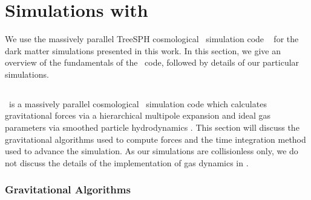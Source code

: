 
%
%

\section{Simulations with \gadgettwo}
\label{sec:gadget}



We use the massively parallel TreeSPH \citep{1989ApJS...70..419H} cosmological \nbody\ simulation code \gadgettwo\ \citep{2001NewA....6...79S, 2005MNRAS.364.1105S} for the dark matter simulations presented in this work.  In this section, we give an overview of the fundamentals of the \gadgettwo\ code, followed by details of our particular simulations.




\subsection{\gadgettwo}
\label{subsec:gadget--gadget}


\gadgettwo\ is a massively parallel cosmological \nbody\ simulation code which calculates gravitational forces via a hierarchical multipole expansion and ideal gas parameters via smoothed particle hydrodynamics \citep[SPH; ][]{1977MNRAS.181..375G}.  This section will discuss the gravitational algorithms used to compute forces and the time integration method used to advance the simulation.  As our simulations are collisionless only, we do not discuss the details of the implementation of gas dynamics in \gadgettwo.



\subsubsection{Gravitational Algorithms}
\label{subsubsec:gadget--gadget--gravitational_algorithms}


